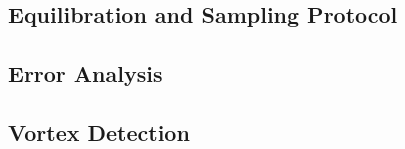 \documentclass[11pt,a4paper]{article}
\begin{document}
\subsection{Equilibration and Sampling Protocol}
\label{sec:protocol}


\subsection{Error Analysis}
\label{sec:error_analysis}


\subsection{Vortex Detection}
\label{sec:vortex_detection}

\end{document}
